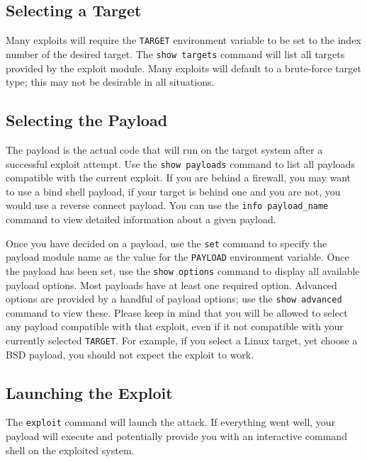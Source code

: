 \documentclass{report}
\begin{document}
		\subsection{Selecting a Target}

\par
Many exploits will require the \texttt{TARGET} environment variable to be set to
the index number of the desired target. The \texttt{show targets} command will
list all targets provided by the exploit module. Many exploits will default to a
brute-force target type; this may not be desirable in all situations.

		\subsection{Selecting the Payload}

\par
The payload is the actual code that will run on the target system after a
successful exploit attempt. Use the \texttt{show payloads} command to list all
payloads compatible with the current exploit. If you are behind a firewall, you
may want to use a bind shell payload, if your target is behind one and you are
not, you would use a reverse connect payload. You can use the
\texttt{info payload\_name} command to view detailed information about a given
payload.

\par
Once you have decided on a payload, use the \texttt{set} command to specify the
payload module name as the value for the \texttt{PAYLOAD} environment variable.
Once the payload has been set, use the \texttt{show options} command to display
all available payload options. Most payloads have at least one required option.
Advanced options are provided by a handful of payload options; use the
\texttt{show advanced} command to view these. Please keep in mind that you will
be allowed to select any payload compatible with that exploit, even if it not
compatible with your currently selected \texttt{TARGET}. For example, if you
select a Linux target, yet choose a BSD payload, you should not expect the
exploit to work.

		\subsection{Launching the Exploit}

\par
The \texttt{exploit} command will launch the attack. If everything went well,
your payload will execute and potentially provide you with an interactive
command shell on the exploited system.
\end{document}
